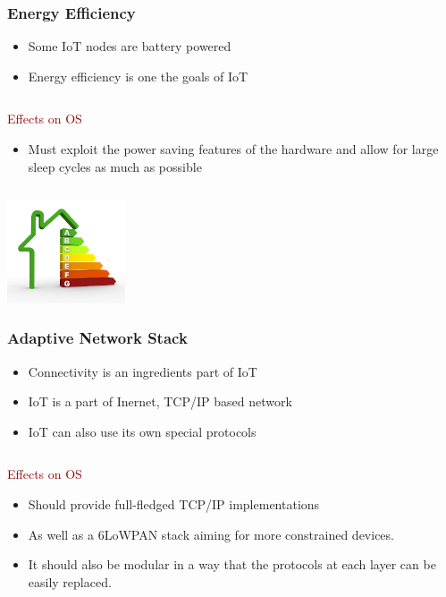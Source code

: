 \documentclass{beamer}
\begin{document}
\begin{frame}
	\frametitle{Energy Efficiency}
	\begin{itemize}
		\justifying
		\item Some IoT nodes are battery powered
		\item Energy efficiency is one the goals of IoT
	\end{itemize}

	\begin{columns}
	\begin{block}{\centering\textcolor{darkred}{Effects on OS}}
		\justifying
		\begin{itemize}
			\item Must exploit the power saving features of the hardware and allow for large sleep
				cycles as much as possible
		\end{itemize}
	\end{block}
	\end{columns}
	\vspace{0.5cm}
	
	\hspace*{7cm} \includegraphics[width=3.5cm]{figs/Energy-efficiency.jpg}
\end{frame}

\begin{frame}
	\frametitle{Adaptive Network Stack}

	\begin{itemize}
		\justifying
		\item Connectivity is an ingredients part of IoT
		\item IoT is a part of Inernet, TCP/IP based network
		\item IoT can also use its own special protocols 
	\end{itemize}

	\begin{columns}
	\column{.8\textwidth}
	\begin{block}{\centering\textcolor{darkred}{Effects on OS}}
		\justifying
		\begin{itemize}
			\item Should provide full-fledged TCP/IP implementations 
			\item As well as a 6LoWPAN stack aiming for more constrained devices.
			\item It should also be modular in a way that the protocols at each layer can be easily replaced. 
		\end{itemize}
	\end{block}
	\end{columns}
	\vspace{0.5cm}
	
\end{frame}
\end{document}
